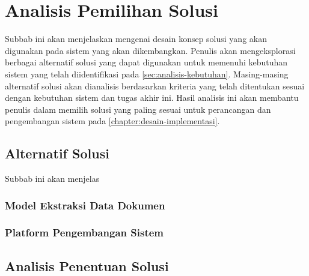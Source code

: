 \section{Analisis Pemilihan Solusi}
\label{sec:analisis-pemilihan-solusi}

Subbab ini akan menjelaskan mengenai desain konsep solusi yang akan digunakan pada sistem yang akan dikembangkan. Penulis akan mengeksplorasi berbagai alternatif solusi yang dapat digunakan untuk memenuhi kebutuhan sistem yang telah diidentifikasi pada \autoref{sec:analisis-kebutuhan}. Masing-masing alternatif solusi akan dianalisis berdasarkan kriteria yang telah ditentukan sesuai dengan kebutuhan sistem dan tugas akhir ini. Hasil analisis ini akan membantu penulis dalam memilih solusi yang paling sesuai untuk perancangan dan pengembangan sistem pada \autoref{chapter:desain-implementasi}.

\subsection{Alternatif Solusi}
\label{subsec:alternatif-solusi}
Subbab ini akan menjelas

\subsubsection{Model Ekstraksi Data Dokumen}
\label{subsubsec:model-ekstraksi-data-dokumen}

\subsubsection{Platform Pengembangan Sistem}
\label{subsubsec:platform-pengembangan-sistem}

\subsection{Analisis Penentuan Solusi}
\label{subsec:analisis-penentuan-solusi}